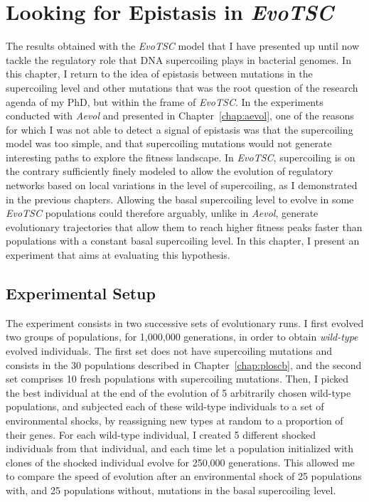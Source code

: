 \chapter{Looking for Epistasis in \emph{EvoTSC}}

The results obtained with the \emph{EvoTSC} model that I have presented up until now tackle the regulatory role that DNA supercoiling plays in bacterial genomes.
In this chapter, I return to the idea of epistasis between mutations in the supercoiling level and other mutations that was the root question of the research agenda of my PhD, but within the frame of \emph{EvoTSC}.
In the experiments conducted with \emph{Aevol} and presented in Chapter~\ref{chap:aevol}, one of the reasons for which I was not able to detect a signal of epistasis was that the supercoiling model was too simple, and that supercoiling mutations would not generate interesting paths to explore the fitness landscape.
In \emph{EvoTSC}, supercoiling is on the contrary sufficiently finely modeled to allow the evolution of regulatory networks based on local variations in the level of supercoiling, as I demonstrated in the previous chapters.
Allowing the basal supercoiling level to evolve in some \emph{EvoTSC} populations could therefore arguably, unlike in \emph{Aevol}, generate evolutionary trajectories that allow them to reach higher fitness peaks faster than populations with a constant basal supercoiling level.
In this chapter, I present an experiment that aims at evaluating this hypothesis.

\section{Experimental Setup}

The experiment consists in two successive sets of evolutionary runs.
I first evolved two groups of populations, for 1,000,000 generations, in order to obtain \emph{wild-type} evolved individuals.
The first set does not have supercoiling mutations and consists in the 30 populations described in Chapter~\ref{chap:ploscb}, and the second set comprises 10 fresh populations with supercoiling mutations.
Then, I picked the best individual at the end of the evolution of 5 arbitrarily chosen wild-type populations, and subjected each of these wild-type individuals to a set of environmental shocks, by reassigning new types at random to a proportion of their genes.
For each wild-type individual, I created 5 different shocked individuals from that individual, and each time let a population initialized with clones of the shocked individual evolve for 250,000 generations.
This allowed me to compare the speed of evolution after an environmental shock of 25 populations with, and 25 populations without, mutations in the basal supercoiling level.

